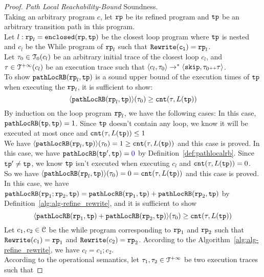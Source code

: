 \begin{proof}
\emph{Path Local Reachability-Bound} Soundness.
\\
Taking an arbitrary program $c$, let $\mathtt{rp}$ be its refined program and $\mathtt{tp}$ be an arbitrary transition path in this program.
\\
Let $l: \mathtt{rp}_l = \mathtt{enclosed}(\mathtt{rp}, \mathtt{tp})$ be the closest loop program where $\mathtt{tp}$ is nested and $c_l$ be the While program of $\mathtt{rp}_l$ such that $\mathtt{Rewrite(c_l)} = \mathtt{rp}_l$. 
\\
Let $\mathtt{\tau}_0 \in \mathcal{T}_0(c_l)$ be an arbitrary initial trace of the closest loop $c_l$, and $\mathtt{\tau} \in \mathcal{T}^{+\infty}(c_l)$ be an execution trace such that $\langle c_l, \mathtt{\tau}_0 \rangle \to^* \langle \mathtt{skip}, \mathtt{\tau}_0 {\scriptscriptstyle ++} \mathtt{\tau} \rangle$.
\\
To show $\mathtt{pathLocRB}(\mathtt{rp}_l, \mathtt{tp})$ is a sound upper bound of the execution times of $\mathtt{tp}$ when executing the $\mathtt{rp}_l$, it is sufficient to show:
\[
  \langle \mathtt{pathLocRB}(\mathtt{rp}_l, \mathtt{tp}) \rangle(\mathtt{\tau}_0) \geq \mathtt{cnt}(\mathtt{\tau}, L(\mathtt{tp}))
  \]
By induction on the loop program $\mathtt{rp}_l$,
we have the following cases:
In this case, $\mathtt{pathLocRB}(\mathtt{tp}, \mathtt{tp}) = 1$. 
Since $\mathtt{tp}$ doesn't contain any loop, we know it will be executed at most once and $\mathtt{cnt}(\mathtt{\tau}, L(\mathtt{tp})) \leq 1$
\\
We have $\langle \mathtt{pathLocRB}(\mathtt{rp}_l, \mathtt{tp}) \rangle(\mathtt{\tau}_0) = 1 \geq \mathtt{cnt}(\mathtt{\tau}, L(\mathtt{tp})) $ and this case is proved.
In this case, we have $\outinB(\tpath', \tpath) = \highlight{0} $ by Definition~\ref{def:pathlocalrb}.
Since $\mathtt{tp}' \neq \mathtt{tp}$, we know $\mathtt{tp}$ isn't executed when executing $c_l$ and $\mathtt{cnt}(\mathtt{\tau}, L(\mathtt{tp})) = 0$.
\\
So we have $\langle \mathtt{pathLocRB}(\mathtt{rp}_l, \mathtt{tp}) \rangle(\mathtt{\tau}_0) = 0 = \mathtt{cnt}(\mathtt{\tau}, L(\mathtt{tp})) $ and this case is proved.
In this case, we have $\mathtt{pathLocRB}(\mathtt{rp}_1;\mathtt{rp}_2, \mathtt{tp}) = \mathtt{pathLocRB}(\mathtt{rp}_1, \mathtt{tp}) + \mathtt{pathLocRB}(\mathtt{rp}_2, \mathtt{tp}) $ by Definition~\ref{alg:alg-refine_rewrite}, and
it is sufficient to show
\[
  \langle \mathtt{pathLocRB}(\mathtt{rp}_1, \mathtt{tp}) + \mathtt{pathLocRB}(\mathtt{rp}_2, \mathtt{tp}) \rangle(\mathtt{\tau}_0) \geq \mathtt{cnt}(\mathtt{\tau}, L(\mathtt{tp})) 
\]
Let $c_1, c_2 \in \mathcal{C}$ be the while program corresponding to $\mathtt{rp}_1$ and $\mathtt{rp}_2$ such that $\mathtt{Rewrite}(c_1) = \mathtt{rp}_1$ and $\mathtt{Rewrite}(c_2) = \mathtt{rp}_2$.
According to the Algorithm~\ref{alg:alg-refine_rewrite}, we have $c_l = c_1; c_2$.
\\
According to the operational semantics, let $\mathtt{\tau}_1, \mathtt{\tau}_2 \in \mathcal{T}^{+\infty}$ be two execution traces such that 

\end{proof}
